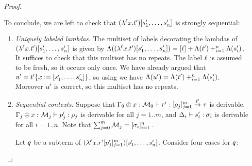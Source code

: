 \begin{proof}
\begin{enumerate}
  To conclude, we are left to check that $(\lambda^{\ell} x. t')[s'_1,\hdots,s'_n]$ is strongly sequential:
  \begin{enumerate}
  \item {\em Uniquely labeled lambdas.}
    The multiset of labels decorating the lambdas of $(\lambda^{\ell} x. t')[s'_1,\hdots,s'_n]$
    is given by
    $\Lambda((\lambda^{\ell} x. t')[s'_1,\hdots,s'_n]) =
     [\ell] + \Lambda(t') +_{i=1}^{n} \Lambda(s'_i)$.
    It suffices to check that this multiset has no repeats.
    The label $\ell$ is assumed to be fresh, so it occurs only once.
    We have already argued that
    $u' = t'\{x := [s'_1,\hdots,s'_n]\}$,
    so using  we have
    $\Lambda(u') = \Lambda(t') +_{i=1}^n \Lambda(s'_i)$.
    Moreover $u'$ is correct, so this multiset has no repeats.
  \item {\em Sequential contexts.}
    Suppose that
    $\Gamma_0 \oplus x : \mathcal{M}_0 \vdash r' : [\rho_j]_{j=1}^m \overset{\ell'}{\to} \tau$
    is derivable,
    $\Gamma_j \oplus x : \mathcal{M}_j \vdash p'_j : \rho_j$
    is derivable for all $j=1..m$,
    and $\Delta_i \vdash s'_i : \sigma_i$ is derivable for all $i=1..n$.
    Note that $\sum_{j=0}^{m} \mathcal{M}_j = [\sigma_i]_{i=1}^{n}$.

    Let $q$ be a subterm of
    $(\lambda^{\ell} x. r'[p'_j]_{j=1}^{m})[s'_1,\hdots,s'_n]$.
    Consider four cases for $q$:


\end{enumerate}
\end{enumerate}
\end{proof}
